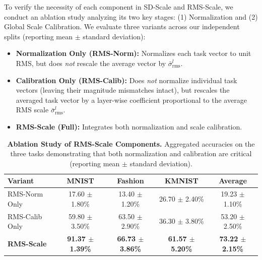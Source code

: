 To verify the necessity of each component in SD-Scale and RMS-Scale, we conduct an ablation study analyzing its two key stages: (1) Normalization and (2) Global Scale Calibration. We evaluate three variants across our independent splits (reporting mean $\pm$ standard deviation):
\begin{itemize}
    \item \textbf{Normalization Only (RMS-Norm):} Normalizes each task vector to unit RMS, but does \textit{not} rescale the average vector by $\bar{\sigma}_{\text{rms}}^l$.
    \item \textbf{Calibration Only (RMS-Calib):} Does \textit{not} normalize individual task vectors (leaving their magnitude mismatches intact), but rescales the averaged task vector by a layer-wise coefficient proportional to the average RMS scale $\bar{\sigma}_{\text{rms}}^l$.
    \item \textbf{RMS-Scale (Full):} Integrates both normalization and scale calibration.
\end{itemize}

\begin{table}[t]
\caption{\textbf{Ablation Study of RMS-Scale Components.} Aggregated accuracies on the three tasks demonstrating that both normalization and calibration are critical (reporting mean $\pm$ standard deviation).}
\label{tab:ablation}
\vskip 0.15in
\begin{center}
\begin{small}
\begin{sc}
\begin{tabular}{lcccc}
\toprule
Variant & MNIST & Fashion & KMNIST & Average \\
\midrule
RMS-Norm Only & 17.60 $\pm$ 1.80\% & 13.40 $\pm$ 1.20\% & 26.70 $\pm$ 2.40\% & 19.23 $\pm$ 1.10\% \\
RMS-Calib Only & 59.80 $\pm$ 3.50\% & 63.50 $\pm$ 2.90\% & 36.30 $\pm$ 3.80\% & 53.20 $\pm$ 2.50\% \\
\midrule
\textbf{RMS-Scale} & \textbf{91.37 $\pm$ 1.39\%} & \textbf{66.73 $\pm$ 3.86\%} & \textbf{61.57 $\pm$ 5.20\%} & \textbf{73.22 $\pm$ 2.15\%} \\
\bottomrule
\end{tabular}
\end{sc}
\end{small}
\end{center}
\vskip -0.1in
\end{table}

